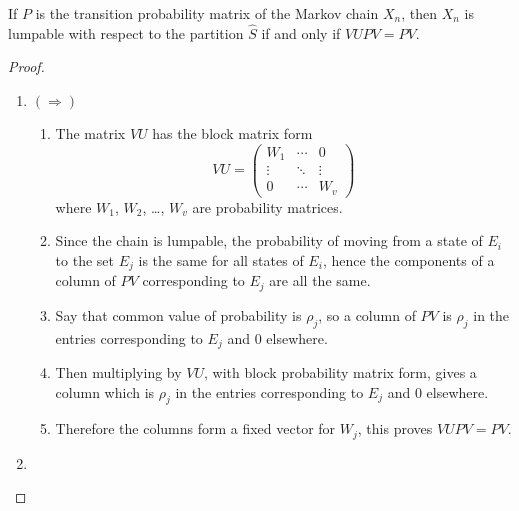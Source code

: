 \documentclass[12pt]{article}
\begin{document}
\begin{theorem}
    If \( P \) is the transition probability matrix of the Markov chain \(
    X_n \), then \( X_n \) is lumpable with respect to the partition \(
    \hat{S} \) if and only if \( VUPV = PV \).
\end{theorem}

\begin{proof}
    \begin{enumerate}
        \item
            \( (\Rightarrow) \)
            \begin{enumerate}
                \item
                    The matrix \( VU \) has the block matrix form
                    \[
                        VU =
                        \begin{pmatrix}
                            W_1 & \cdots & 0 \\
                            \vdots & \ddots & \vdots \\
                            0 & \cdots & W_v
                        \end{pmatrix}
                    \] where \( W_1 \), \( W_2 \), \dots, \( W_v \) are
                    probability matrices.
                \item
                    Since the chain is lumpable, the probability of
                    moving from a state of \( E_i \) to the set \( E_j \)
                    is the same for all states of \( E_i \), hence the
                    components of a column of \( PV \) corresponding to \(
                    E_j \) are all the same.
                \item
                    Say that common value of probability is \( \rho_j \),
                    so a column of \( PV \) is \( \rho_j \) in the
                    entries corresponding to \( E_j \) and \( 0 \)
                    elsewhere.
                \item
                    Then multiplying by \( VU \), with block probability
                    matrix form, gives a column which is \( \rho_j \) in
                    the entries corresponding to \( E_j \) and \( 0 \)
                    elsewhere.
                \item
                    Therefore the columns form a fixed vector for \( W_j
                    \), this proves \( VUPV = PV \).
            \end{enumerate}
        \item

\end{enumerate}
\end{proof}
\end{document}

